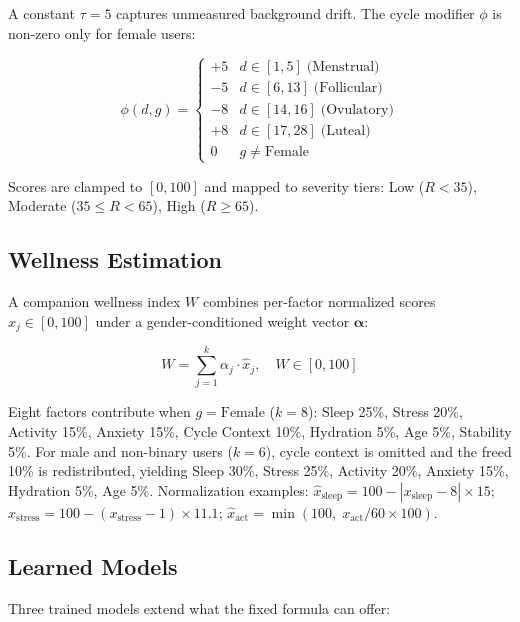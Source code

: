 \documentclass[conference]{IEEEtran}
\begin{document}
A constant $\tau = 5$ captures unmeasured background drift. The cycle modifier $\phi$ is non-zero only for female users:

\begin{equation}
\phi(d, g) = \begin{cases}
+5 & d \in [1,5] \;\text{(Menstrual)}\\
-5 & d \in [6,13] \;\text{(Follicular)}\\
-8 & d \in [14,16] \;\text{(Ovulatory)}\\
+8 & d \in [17,28] \;\text{(Luteal)}\\
0  & g \neq \text{Female}
\end{cases}
\label{eq:phase}
\end{equation}

Scores are clamped to $[0,100]$ and mapped to severity tiers: Low ($R < 35$), Moderate ($35 \leq R < 65$), High ($R \geq 65$).

\subsection{Wellness Estimation}

A companion wellness index $W$ combines per-factor normalized scores $\hat{x}_j \in [0,100]$ under a gender-conditioned weight vector $\boldsymbol{\alpha}$:

\begin{equation}
W = \sum_{j=1}^{k} \alpha_j \cdot \hat{x}_j, \quad W \in [0,100]
\label{eq:wellness}
\end{equation}

Eight factors contribute when $g = \text{Female}$ ($k=8$): Sleep 25\%, Stress 20\%, Activity 15\%, Anxiety 15\%, Cycle Context 10\%, Hydration 5\%, Age 5\%, Stability 5\%. For male and non-binary users ($k=6$), cycle context is omitted and the freed 10\% is redistributed, yielding Sleep 30\%, Stress 25\%, Activity 20\%, Anxiety 15\%, Hydration 5\%, Age 5\%. Normalization examples: $\hat{x}_{\text{sleep}} = 100 - |x_{\text{sleep}} - 8| \times 15$; $\hat{x}_{\text{stress}} = 100 - (x_{\text{stress}} - 1) \times 11.1$; $\hat{x}_{\text{act}} = \min(100,\; x_{\text{act}}/60 \times 100)$.

\subsection{Learned Models}

Three trained models extend what the fixed formula can offer:
\end{document}
